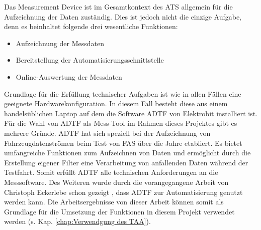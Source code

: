 \documentclass[12pt,a4paper]{report}
\begin{document}
Das Measurement Device ist im Gesamtkontext des ATS allgemein für die Aufzeichnung der Daten zuständig. Dies ist jedoch nicht die einzige Aufgabe, denn es beinhaltet folgende drei wesentliche Funktionen:
\begin{itemize}
\item{Aufzeichnung der Messdaten}
\item{Bereitstellung der Automatisierungsschnittstelle}
\item{Online-Auswertung der Messdaten}
\end{itemize}
Grundlage für die Erfüllung technischer Aufgaben ist wie in allen Fällen eine geeignete Hardwarekonfiguration. In diesem Fall besteht diese aus einem handelsüblichen Laptop auf dem die Software ADTF von Elektrobit installiert ist. Für die Wahl von ADTF als Mess-Tool im Rahmen dieses Projektes gibt es mehrere Gründe. ADTF hat sich speziell bei der Aufzeichnung von Fahrzeugdatenströmen beim Test von FAS über die Jahre etabliert. Es bietet umfangreiche Funktionen zum Aufzeichnen von Daten und ermöglicht durch die Erstellung eigener Filter eine Verarbeitung von anfallenden Daten während der Testfahrt. Somit erfüllt ADTF alle technischen Anforderungen an die Messsoftware. Des Weiteren wurde durch die vorangegangene Arbeit von Christoph Eckerlebe schon gezeigt \cite{MasterEckerlebe}, dass ADTF zur Automatisierung genutzt werden kann. Die Arbeitsergebnisse von dieser Arbeit können somit als Grundlage für die Umsetzung der Funktionen in diesem Projekt verwendet werden (s. Kap. \ref{chap:Verwendgung des TAA}).
\end{document}
